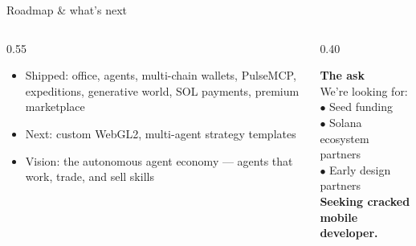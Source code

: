 \documentclass[aspectratio=169]{beamer}
\begin{document}
\begin{frame}{Roadmap \& what's next}
  \vspace{16pt}
  \begin{columns}[T]
    \begin{column}{0.55\textwidth}
      \begin{itemize}
        \footnotesize
        \item \alert{Shipped:} office, agents, multi-chain wallets, PulseMCP, expeditions, generative world, SOL payments, premium marketplace
        \item \alert{Next:} custom WebGL2, multi-agent strategy templates
        \item \alert{Vision:} the autonomous agent economy --- agents that work, trade, and sell skills
      \end{itemize}
    \end{column}
    \begin{column}{0.40\textwidth}
      \begin{tcolorbox}[colback=accent, colframe=accent, sharp corners, boxrule=0pt]
        \color{white}\small
        \textbf{The ask}\\[4pt]
        We're looking for:\\[4pt]
        $\bullet$ Seed funding\\
        $\bullet$ Solana ecosystem partners\\
        $\bullet$ Early design partners\\[6pt]
        \textbf{\color{warn}Seeking cracked mobile developer.}
      \end{tcolorbox}
    \end{column}
  \end{columns}
\end{frame}
\end{document}
